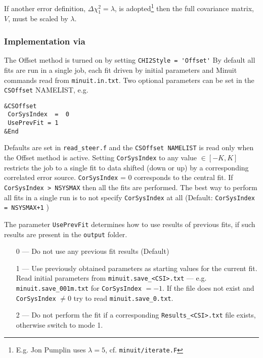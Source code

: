 If another error definition, $\Delta\chi_1^2 = \lambda$, 
is adopted\footnote{E.g. Jon Pumplin uses $\lambda=5$, cf. \texttt{minuit/iterate.F}} then
the full covariance matrix, $V$, must be scaled by $\lambda$. 

\subsubsection{Implementation via \fitter\ } 

The Offset method is turned on by setting \verb:CHI2Style = 'Offset':
By default all fits are run in a single job, each fit driven by initial parameters and Minuit commands read from \verb'minuit.in.txt'.
Two optional parameters can be set in the \verb'CSOffset' NAMELIST, e.g.
\vspace*{-2.5ex}
\begin{verbatim}
&CSOffset
 CorSysIndex  =  0
 UsePrevFit = 1
&End
\end{verbatim}
\vspace*{-1ex}
Defaults are set in \verb'read_steer.f'
and the \verb'CSOffset NAMELIST' is read only when the Offset method is active.
Setting \verb'CorSysIndex' to any value $\in [-K, K]$ 
restricts the job to a single fit to data shifted (down or up) by a corresponding correlated error source.
\verb'CorSysIndex' = 0 corresponds to the central fit.
If \verb'CorSysIndex > NSYSMAX' then all the fits are performed.
The best way to perform all fits in a single run is 
to not specify \verb'CorSysIndex' at all 
(Default: \verb'CorSysIndex = NSYSMAX+1' )
\vspace{0.4cm}

The parameter {\tt UsePrevFit} determines how to use results of previous fits,
if such results are present in the \verb'output' folder.
\begin{enumerate}
\item [0 ---]
Do not use any previous fit results (Default)
\item [1 ---]
Use previously obtained parameters as starting values for the current fit.
Read initial parameters from \verb'minuit.save_<CSI>.txt'
 --- e.g.  \verb'minuit.save_001m.txt' for \verb'CorSysIndex' $= -1$.
If the file does not exist and \verb'CorSysIndex' $\neq 0$ try to read
\verb'minuit.save_0.txt'.
\item [2 ---]
Do not perform the fit if a corresponding \verb'Results_<CSI>.txt' file exists,
otherwise switch to mode 1.
\end{enumerate}

